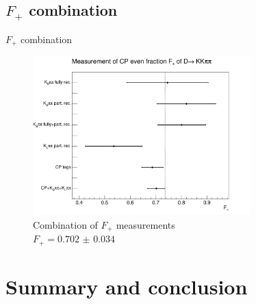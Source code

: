\documentclass{beamer}
\begin{document}
\subsection{\texorpdfstring{$F_+$}{F+} combination}
\begin{frame}{$F_+$ combination}
  \begin{figure}
    \centering
    \includegraphics[width=0.75\textwidth]{Plots/FPlus_combination_comparison.png}
    \caption{Combination of $F_+$ measurements\\$F_+ = \SI{0.702(34)}{}$}
  \end{figure}
\end{frame}

\section{Summary and conclusion}
\end{document}

